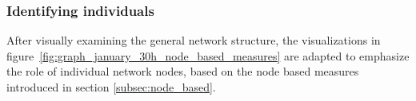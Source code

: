 \subsubsection{Identifying individuals}
\label{subsubsec:vis_individuals}    

After visually examining the general network structure, the visualizations in figure~\ref{fig:graph_january_30h_node_based_measures} are adapted to emphasize the role of individual network nodes, based on the node based measures introduced in section \ref{subsec:node_based}.  

\begin{figure}[htpb]%
	\centering 
				
\end{figure}
